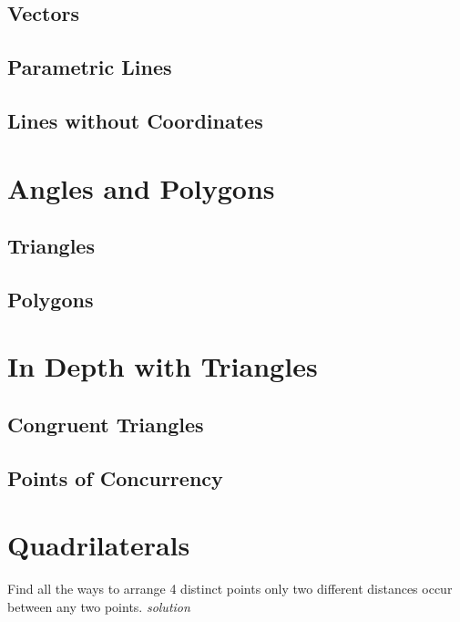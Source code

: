 \documentclass{amsbook}
\begin{document}
\section{Vectors}

\section{Parametric Lines}

\section{Lines without Coordinates}


\chapter{Angles and Polygons}

\section{Triangles}

\section{Polygons}


\chapter{In Depth with Triangles}

\section{Congruent Triangles}

\section{Points of Concurrency}


\chapter{Quadrilaterals}
\begin{Exercise}[title={Interesting Family of Quadrilaterals},difficulty=2 ,label=6a1 ]
	Find all the ways to arrange 4 distinct points only two different distances occur between any two points.
	\hfill \emph{solution} 
\end{Exercise}
\begin{Answer}[ref={6a1}]

\end{Answer}
\end{document}
